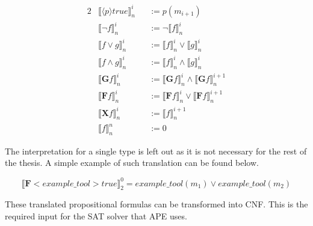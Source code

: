 \documentclass{article}
\begin{document}
\begin{alignat*}{2}
    &\llbracket \langle p \rangle true \rrbracket^i_n  &&:= p(m_{i+1}) \\
    &\llbracket \neg f \rrbracket^i_n &&:= \neg \llbracket f \rrbracket^i_n \\
    &\llbracket f\vee g \rrbracket^i_n &&:= \llbracket f \rrbracket^i_n \vee \llbracket g \rrbracket^i_n \\
   & \llbracket f\wedge g \rrbracket^i_n &&:=\llbracket f \rrbracket^i_n \wedge \llbracket g \rrbracket^i_n \\
   &  \llbracket \textbf{G}f \rrbracket^i_n &&:= \llbracket \textbf{G} f \rrbracket^i_n \wedge  \llbracket \textbf{G} f\rrbracket^{i+1}_n \\
    & \llbracket \textbf{F}f \rrbracket^i_n &&:= \llbracket \textbf{F} f \rrbracket^i_n \vee  \llbracket \textbf{F} f\rrbracket^{i+1}_n \\
   &  \llbracket \textbf{X}f \rrbracket^i_n &&:=  \llbracket f \rrbracket^{i+1}_n \\
   & \llbracket f \rrbracket^n_n &&:= 0
\end{alignat*}

The interpretation for a single type is left out as it is not necessary for the rest of the thesis. A simple example of such translation can be found below.

\begin{equation*}
    \llbracket \textbf{F} <example\_tool>true \rrbracket^0_2 = example\_tool(m_1) \vee example\_tool(m_2)
\end{equation*}

These translated propositional formulas can be transformed into CNF. This is the required input for the SAT solver that APE uses.  











\end{document}

